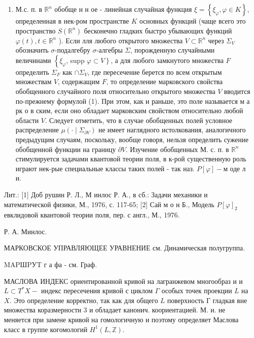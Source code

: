 \documentclass[10pt]{article}
\begin{document}
\begin{enumerate}
  \item М.с. п. в $\mathbb{R}^{n}$ обобще н н ое - линейная случайная функция $\xi=\left\{\xi_{\varphi}, \varphi \in K\right\}$, определенная в нек-ром пространстве $K$ основных функций (чаще всего это пространство $S\left(\mathbb{R}^{n}\right)$ бесконечно гладких быстро убывающих функций $\varphi(t), t \in \mathbb{R}^{n}$ ). Если лля любого открытого множества $V \subset \mathbb{R}^{n}$ через $\Sigma_{V}$ обозначить $\sigma$-подалгебру $\sigma$-алгебры $\Sigma$, порожденную случайными величинами $\left\{\xi_{\varphi}\right.$, supp $\left.\varphi \subset V\right\}$, а для любого замкнутого множества $F$ определить $\Sigma_{F}$ как $\cap \Sigma_{V}$, где пересечение берется по всем открытым множествам $V$, содержащим $F$, то определение марковского свойства обобщенного случайного поля относительно открытого множества $V$ вводится по-прежнему формулой (1). При этом, как и раньше, это поле называется м а рк о в ским, если оно обладает марковским свойством относительно любой области $V$. Следует отметить, что в случае обобщенных полей условное распределение $\mu\left(\cdot \mid \Sigma_{\partial V}\right)$ не имеет наглядного истолкования, аналогичного предыдущим случаям, поскольку, вообще говоря, нельзя определить сужение обобщенной функции на границу $\partial V$. Изучение обобщенных М. с. п. в $\mathbb{R}^{n}$ стимулируется задачами квантовой теории поля, в к-рой существенную роль играют нек-рые специальные классы таких полей - так наз. $P[\varphi]-м$ оде л и.



\end{enumerate}



Лит.: [1] Доб рушин Р. Л., М инлос Р. А., в сб.: Задачи механики и математической физики, М., 1976, с. 117-65; [2] Сай м о н Б., Модель $P[\varphi]_{2}$ евклидовой квантовой теории поля, пер. с англ., М., 1976.



Р. А. Минлос.



МАРКОВСКОЕ УПРАВЛЯЮЩЕЕ УРАВНЕНИЕ см. Динамическая полугруппа.



MAPШPУT г а фа - см. Граф.



МАСЛОВА ИНДЕКС ориентированной кривой на лагранжевом многообраз и и $L \subset T^{*} X-$ индекс пересечения кривой с циклом $\Gamma$ особых точек проекции $L$ на $X$. Это определение корректно, так как для общего $L$ поверхность Г гладкая вне множества коразмерности 3 и обладает канонич. коориентацией. М. и. не меняется при замене кривой на гомологичную и поэтому определяет Маслова класс в группе когомологий $H^{1}(L, \mathbb{Z})$.
\end{document}
